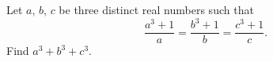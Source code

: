 Let $a$, $b$, $c$ be three distinct real numbers such that
\[
\dfrac{a^3+1}{a}=\dfrac{b^3+1}{b}=\dfrac{c^3+1}{c}.
\]
Find $a^3+b^3+c^3$.
